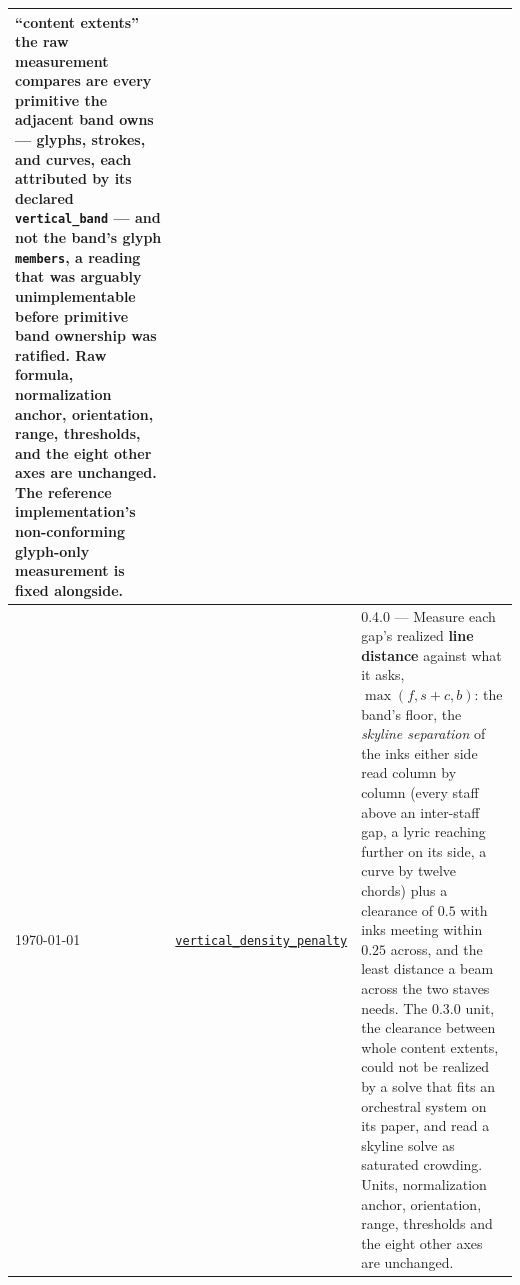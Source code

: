 \documentclass[11pt,letterpaper]{report}
\begin{document}
\begin{longtable}{p{2cm} p{2.5cm} p{9cm}}
  ``content extents'' the raw measurement compares are every primitive the
  adjacent band owns --- glyphs, strokes, and curves, each attributed by its
  declared \texttt{vertical\_band} --- and not the band's glyph
  \texttt{members}, a reading that was arguably unimplementable before
  primitive band ownership was ratified. Raw formula, normalization anchor,
  orientation, range, thresholds, and the eight other axes are unchanged. The
  reference implementation's non-conforming glyph-only measurement is fixed
  alongside. \\
  \midrule
  \today & \hyperref[sec:metrics:vertical]{\texttt{vertical\_density\_penalty}}
  & 0.4.0 --- Measure each gap's realized \textbf{line distance} against what
  it asks, $\max(f, s + c, b)$: the band's floor, the \emph{skyline
  separation} of the inks either side read column by column (every staff
  above an inter-staff gap, a lyric reaching further on its side, a curve by
  twelve chords) plus a clearance of $0.5$ with inks meeting within $0.25$
  across, and the least distance a beam across the two staves needs. The
  0.3.0 unit, the clearance between whole content extents, could not be
  realized by a solve that fits an orchestral system on its paper, and read
  a skyline solve as saturated crowding. Units, normalization anchor,
  orientation, range, thresholds and the eight other axes are unchanged. \\
\bottomrule
\end{longtable}
\end{document}
